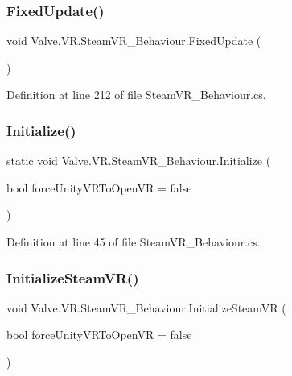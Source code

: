 \subsubsection{\texorpdfstring{FixedUpdate()}{FixedUpdate()}}
{\footnotesize\ttfamily void Valve.\+V\+R.\+Steam\+V\+R\+\_\+\+Behaviour.\+Fixed\+Update (\begin{DoxyParamCaption}{ }\end{DoxyParamCaption})\hspace{0.3cm}{\ttfamily [protected]}}



Definition at line 212 of file Steam\+V\+R\+\_\+\+Behaviour.\+cs.

\mbox{\label{class_valve_1_1_v_r_1_1_steam_v_r___behaviour_a973a93206dbe36401d7cb5173e772420}} 
\subsubsection{\texorpdfstring{Initialize()}{Initialize()}}
{\footnotesize\ttfamily static void Valve.\+V\+R.\+Steam\+V\+R\+\_\+\+Behaviour.\+Initialize (\begin{DoxyParamCaption}\item[{bool}]{force\+Unity\+V\+R\+To\+Open\+VR = {\ttfamily false} }\end{DoxyParamCaption})\hspace{0.3cm}{\ttfamily [static]}}



Definition at line 45 of file Steam\+V\+R\+\_\+\+Behaviour.\+cs.

\mbox{\label{class_valve_1_1_v_r_1_1_steam_v_r___behaviour_a3170aec2fbeb80909b0ba9bf14596568}} 
\subsubsection{\texorpdfstring{InitializeSteamVR()}{InitializeSteamVR()}}
{\footnotesize\ttfamily void Valve.\+V\+R.\+Steam\+V\+R\+\_\+\+Behaviour.\+Initialize\+Steam\+VR (\begin{DoxyParamCaption}\item[{bool}]{force\+Unity\+V\+R\+To\+Open\+VR = {\ttfamily false} }\end{DoxyParamCaption})}



